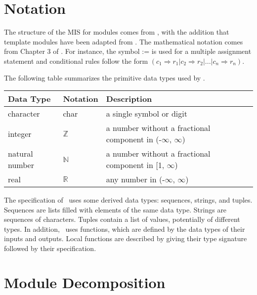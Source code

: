 \documentclass[12pt, titlepage]{article}
\begin{document}
\section{Notation}


The structure of the MIS for modules comes from \citet{HoffmanAndStrooper1995},
with the addition that template modules have been adapted from
\cite{GhezziEtAl2003}.  The mathematical notation comes from Chapter 3 of
\citet{HoffmanAndStrooper1995}.  For instance, the symbol := is used for a
multiple assignment statement and conditional rules follow the form $(c_1
  \Rightarrow r_1 | c_2 \Rightarrow r_2 | ... | c_n \Rightarrow r_n )$.

The following table summarizes the primitive data types used by \progname.

\begin{center}
  \renewcommand{\arraystretch}{1.2}
  \noindent
  \begin{tabular}{l l p{7.5cm}}
    \toprule
    \textbf{Data Type} & \textbf{Notation} & \textbf{Description}                                             \\
    \midrule
    character          & char              & a single symbol or digit                                         \\
    integer            & $\mathbb{Z}$      & a number without a fractional component in (-$\infty$, $\infty$) \\
    natural number     & $\mathbb{N}$      & a number without a fractional component in [1, $\infty$)         \\
    real               & $\mathbb{R}$      & any number in (-$\infty$, $\infty$)                              \\
    \bottomrule
  \end{tabular}
\end{center}

\noindent
The specification of \progname \ uses some derived data types: sequences, strings, and
tuples. Sequences are lists filled with elements of the same data type. Strings
are sequences of characters. Tuples contain a list of values, potentially of
different types. In addition, \progname \ uses functions, which
are defined by the data types of their inputs and outputs. Local functions are
described by giving their type signature followed by their specification.

\section{Module Decomposition}
\end{document}

